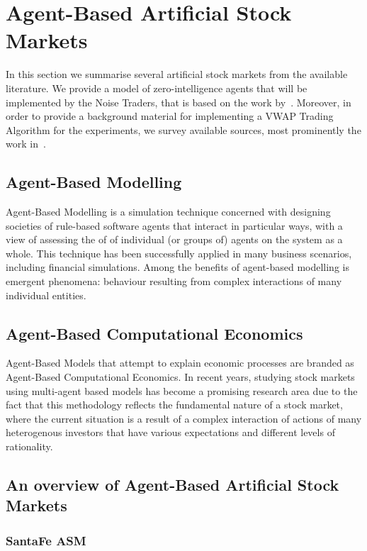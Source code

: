 \section{Agent-Based Artificial Stock Markets}
\label{Chapters/Background/Agent-Based-Modelling}

In this section we summarise several artificial stock markets from the available literature. We provide a model of zero-intelligence agents that will be implemented by the Noise Traders, that is based on the work by~\citet[chap.~4]{Gilles2006}. Moreover, in order to provide a background material for implementing a VWAP Trading Algorithm for the experiments, we survey available sources, most prominently the work in~\cite{Coggins2006, Kakade2004}. 

\subsection{Agent-Based Modelling}
Agent-Based Modelling is a simulation technique concerned with designing societies of rule-based software agents that interact in particular ways, with a view of assessing the of of individual (or groups of) agents on the system as a whole. This technique has been successfully applied in many business scenarios, including financial simulations. Among the benefits of agent-based modelling is emergent phenomena: behaviour resulting from complex interactions of many individual entities.

\subsection{Agent-Based Computational Economics}
Agent-Based Models that attempt to explain economic processes are branded as Agent-Based Computational Economics. In recent years, studying stock markets using multi-agent based models has become a promising research area due to the fact that this methodology reflects the fundamental nature of a stock market, where the current situation is a result of a complex interaction of actions of many heterogenous investors that have various expectations and different levels of rationality.

\subsection{An overview of Agent-Based Artificial Stock Markets}

\subsubsection*{SantaFe ASM}









